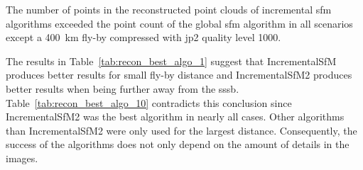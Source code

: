 \begin{table}[htb]
    \centering
    \caption{\Gls{sfm} algorithm with most reconstructed points for each scenario with a \SI{10}{\kilo\meter} \gls{sssb}. Seq1 refers to algorithm IncrementalSfM, Seq2 refers to algorithm IncrementalSfM2 and Glob refers to algorithm GlobalSfM.}
    \label{tab:recon_best_algo_10}
\end{table}


The number of points in the reconstructed point clouds of incremental \gls{sfm} algorithms exceeded the point count of the global \gls{sfm} algorithm in all scenarios except a \SI{400}{\kilo\meter} fly-by compressed with \gls{jp2} quality level 1000.

The results in Table~\ref{tab:recon_best_algo_1} suggest that IncrementalSfM produces better results for small fly-by distance and IncrementalSfM2 produces better results when being further away from the \gls{sssb}. Table~\ref{tab:recon_best_algo_10} contradicts this conclusion since IncrementalSfM2 was the best algorithm in nearly all cases. Other algorithms than IncrementalSfM2 were only used for the largest distance. Consequently, the success of the algorithms does not only depend on the amount of details in the images. 

